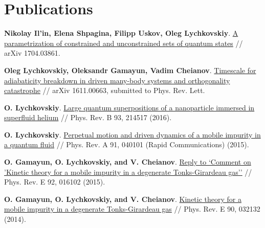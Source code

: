 \documentclass[10pt,a4paper,sans]{moderncv}
\begin{document}
	



	
	
\section{Publications}

	{\textbf{Nikolay Il'in, Elena Shpagina, Filipp Uskov, Oleg Lychkovskiy}.
	{\textcolor{blue}{\href{http://arxiv.org/abs/1704.03861}{A parametrization of constrained and unconstrained sets of quantum
  states}}} //  arXiv 1704.03861.}

	{\textbf{Oleg Lychkovskiy, Oleksandr Gamayun, Vadim Cheianov}.
	{\textcolor{blue}{\href{https://arxiv.org/abs/1611.00663}{Timescale for adiabaticity breakdown in driven many-body systems and orthogonality catastrophe}}} //  arXiv 1611.00663, submitted to Phys. Rev. Lett.}



	{\textbf{O. Lychkovskiy}.
	{\textcolor{blue}{\href{http://journals.aps.org/prb/abstract/10.1103/PhysRevB.93.214517}{Large quantum superpositions of a nanoparticle immersed in superfluid helium}}} //  Phys. Rev. B 93, 214517 (2016).}


	{\textbf{O. Lychkovskiy}.
	{\textcolor{blue}{\href{http://dx.doi.org/10.1103/PhysRevA.91.040101}{Perpetual motion and driven dynamics of a mobile impurity in a quantum fluid}}} //
	Phys. Rev. A 91, 040101 (Rapid Communications) (2015).}

	{\textbf{O. Gamayun, O. Lychkovskiy, and V. Cheianov}.
	{\textcolor{blue}{\href{http://dx.doi.org/10.1103/PhysRevE.92.016102}{Reply to `Comment on 'Kinetic theory for a mobile impurity in a degenerate Tonks-Girardeau gas{'}{'}}}} //
	Phys. Rev. E 92, 016102 (2015).}

	{\textbf{O. Gamayun, O. Lychkovskiy, and V. Cheianov}.
	{\textcolor{blue}{\href{http://dx.doi.org/10.1103/PhysRevE.90.032132}{Kinetic theory for a mobile impurity in a degenerate Tonks-Girardeau gas}}} //
	Phys. Rev. E 90, 032132 (2014).}
\end{document}
